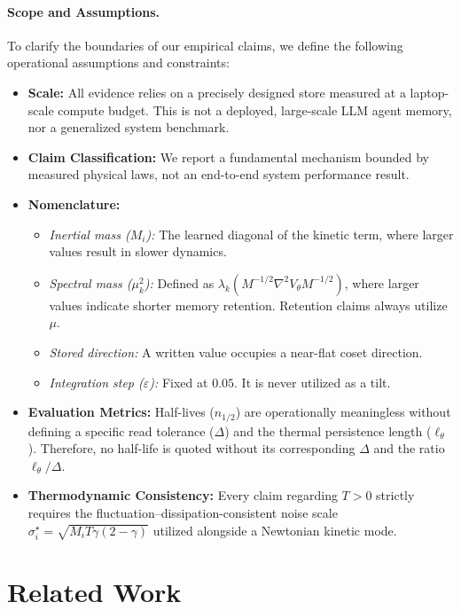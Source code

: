 \documentclass{article}
\begin{document}
\paragraph{Scope and Assumptions.}
To clarify the boundaries of our empirical claims, we define the following operational assumptions and constraints:
\begin{itemize}
    \item \textbf{Scale:} All evidence relies on a precisely designed store measured at a laptop-scale compute budget. This is not a deployed, large-scale LLM agent memory, nor a generalized system benchmark.
    \item \textbf{Claim Classification:} We report a fundamental mechanism bounded by measured physical laws, not an end-to-end system performance result.
    \item \textbf{Nomenclature:}
    \begin{itemize}
        \item \emph{Inertial mass ($M_i$):} The learned diagonal of the kinetic term, where larger values result in slower dynamics.
        \item \emph{Spectral mass ($\mu_k^2$):} Defined as $\lambda_k(M^{-1/2}\nabla^2V_\theta M^{-1/2})$, where larger values indicate shorter memory retention. Retention claims always utilize $\mu$.
        \item \emph{Stored direction:} A written value occupies a near-flat coset direction.
        \item \emph{Integration step ($\varepsilon$):} Fixed at $0.05$. It is never utilized as a tilt.
    \end{itemize}
    \item \textbf{Evaluation Metrics:} Half-lives ($n_{1/2}$) are operationally meaningless without defining a specific read tolerance ($\Delta$) and the thermal persistence length ($\ell_\theta$). Therefore, no half-life is quoted without its corresponding $\Delta$ and the ratio $\ell_\theta/\Delta$.
    \item \textbf{Thermodynamic Consistency:} Every claim regarding $T>0$ strictly requires the fluctuation--dissipation-consistent noise scale $\sigma^\star_i=\sqrt{M_iT\gamma(2-\gamma)}$ utilized alongside a Newtonian kinetic mode.
\end{itemize}

\section{Related Work}\label{sec:related}
\end{document}
